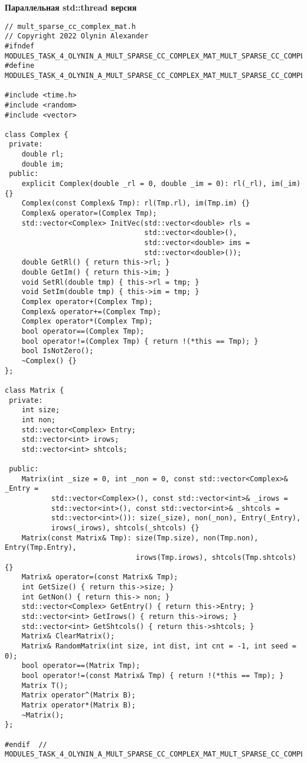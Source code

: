 \documentclass[12pt]{report}
\begin{document}
\textbf{Параллельная std::thread версия}
\begin{lstlisting}
// mult_sparse_cc_complex_mat.h
// Copyright 2022 Olynin Alexander
#ifndef MODULES_TASK_4_OLYNIN_A_MULT_SPARSE_CC_COMPLEX_MAT_MULT_SPARSE_CC_COMPLEX_MAT_H_
#define MODULES_TASK_4_OLYNIN_A_MULT_SPARSE_CC_COMPLEX_MAT_MULT_SPARSE_CC_COMPLEX_MAT_H_

#include <time.h>
#include <random>
#include <vector>

class Complex {
 private:
    double rl;
    double im;
 public:
    explicit Complex(double _rl = 0, double _im = 0): rl(_rl), im(_im) {}
    Complex(const Complex& Tmp): rl(Tmp.rl), im(Tmp.im) {}
    Complex& operator=(Complex Tmp);
    std::vector<Complex> InitVec(std::vector<double> rls =
                                 std::vector<double>(),
                                 std::vector<double> ims =
                                 std::vector<double>());
    double GetRl() { return this->rl; }
    double GetIm() { return this->im; }
    void SetRl(double tmp) { this->rl = tmp; }
    void SetIm(double tmp) { this->im = tmp; }
    Complex operator+(Complex Tmp);
    Complex& operator+=(Complex Tmp);
    Complex operator*(Complex Tmp);
    bool operator==(Complex Tmp);
    bool operator!=(Complex Tmp) { return !(*this == Tmp); }
    bool IsNotZero();
    ~Complex() {}
};

class Matrix {
 private:
    int size;
    int non;
    std::vector<Complex> Entry;
    std::vector<int> irows;
    std::vector<int> shtcols;

 public:
    Matrix(int _size = 0, int _non = 0, const std::vector<Complex>& _Entry =
           std::vector<Complex>(), const std::vector<int>& _irows =
           std::vector<int>(), const std::vector<int>& _shtcols =
           std::vector<int>()): size(_size), non(_non), Entry(_Entry),
           irows(_irows), shtcols(_shtcols) {}
    Matrix(const Matrix& Tmp): size(Tmp.size), non(Tmp.non), Entry(Tmp.Entry),
                               irows(Tmp.irows), shtcols(Tmp.shtcols) {}
    Matrix& operator=(const Matrix& Tmp);
    int GetSize() { return this->size; }
    int GetNon() { return this-> non; }
    std::vector<Complex> GetEntry() { return this->Entry; }
    std::vector<int> GetIrows() { return this->irows; }
    std::vector<int> GetShtcols() { return this->shtcols; }
    Matrix& ClearMatrix();
    Matrix& RandomMatrix(int size, int dist, int cnt = -1, int seed = 0);
    bool operator==(Matrix Tmp);
    bool operator!=(const Matrix& Tmp) { return !(*this == Tmp); }
    Matrix T();
    Matrix operator^(Matrix B);
    Matrix operator*(Matrix B);
    ~Matrix();
};

#endif  // MODULES_TASK_4_OLYNIN_A_MULT_SPARSE_CC_COMPLEX_MAT_MULT_SPARSE_CC_COMPLEX_MAT_H_

\end{lstlisting}
\end{document}
